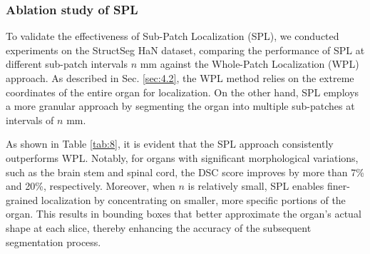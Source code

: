 \documentclass[times,twocolumn,final]{elsarticle}
\begin{document}
\subsubsection{Ablation study of SPL}
To validate the effectiveness of Sub-Patch Localization (SPL), we conducted experiments on the StructSeg HaN dataset, comparing the performance of SPL at different sub-patch intervals $n$ mm against the Whole-Patch Localization (WPL) approach. As described in Sec. \ref{sec:4.2}, the WPL method relies on the extreme coordinates of the entire organ for localization. On the other hand, SPL employs a more granular approach by segmenting the organ into multiple sub-patches at intervals of $n$ mm.
\par As shown in Table \ref{tab:8}, it is evident that the SPL approach consistently outperforms WPL. Notably, for organs with significant morphological variations, such as the brain stem and spinal cord, the DSC score improves by more than 7\% and 20\%, respectively.  Moreover, when $n$ is relatively small, SPL enables finer-grained localization by concentrating on smaller, more specific portions of the organ.  This results in bounding boxes that better approximate the organ's actual shape at each slice, thereby enhancing the accuracy of the subsequent segmentation process. 

\end{document}
